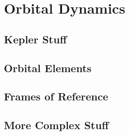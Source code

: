 \chapter{Orbital Dynamics}

\section{Kepler Stuff}

\section{Orbital Elements}

\section{Frames of Reference}

\section{More Complex Stuff}